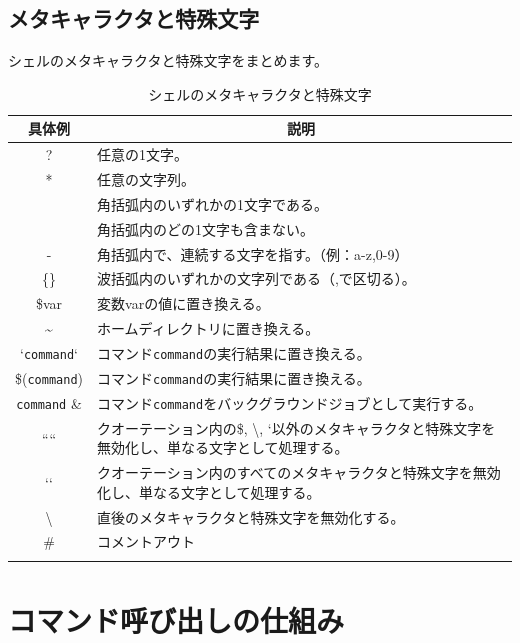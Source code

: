 \documentclass[a4j]{ltjsreport}
\begin{document}
    \subsection{メタキャラクタと特殊文字}
    シェルのメタキャラクタと特殊文字をまとめます。
    \begin{longtable}[c]{|c|l|}
        \hline
        \multicolumn{1}{|c|}{\textbf{具体例}}&\multicolumn{1}{|c|}{\textbf{説明}}\\
        \hline\hline
        ? & 任意の1文字。\\
        \hline
        * & 任意の文字列。\\
        \hline
        [\quad]  & 角括弧内のいずれかの1文字である。\\
        \hline
        [!\quad] & 角括弧内のどの1文字も含まない。\\
        \hline
        - & 角括弧内で、連続する文字を指す。（例：a-z,0-9）\\
        \hline
        \{\quad\} & 波括弧内のいずれかの文字列である（,で区切る）。\\
        \hline\hline
        \$var & 変数varの値に置き換える。\\
        \hline
        \textasciitilde &ホームディレクトリに置き換える。\\
        \hline
        `\texttt{command}` & コマンド\texttt{command}の実行結果に置き換える。\\
        \hline
        \$(\texttt{command}) & コマンド\texttt{command}の実行結果に置き換える。\\
        \hline
        \texttt{command} \& & コマンド\texttt{command}をバックグラウンドジョブとして実行する。\\
        \hline
        “\quad“ & クオーテーション内の\$, \textbackslash, `以外のメタキャラクタと特殊文字を無効化し、単なる文字として処理する。\\
        \hline
        ‘\quad‘ & クオーテーション内のすべてのメタキャラクタと特殊文字を無効化し、単なる文字として処理する。\\
        \hline
        \textbackslash & 直後のメタキャラクタと特殊文字を無効化する。\\
        \hline
        \# & コメントアウト\\
        \hline
        \caption{シェルのメタキャラクタと特殊文字}
    \end{longtable}
    


    \section{コマンド呼び出しの仕組み}
\end{document}
